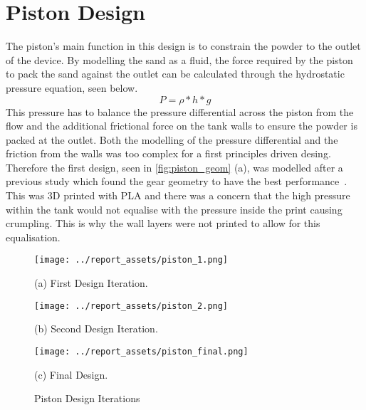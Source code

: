 \section{Piston Design}\label{sec:piston}
The piston's main function in this design is to constrain the powder to the outlet of the device. By modelling the sand as a fluid, the force required by the piston to pack the sand against the outlet can be calculated through the hydrostatic pressure equation, seen below. 
\begin{equation}\label{equ:hydrostatic}
P = \rho * h * g
\end{equation}
This pressure has to balance the pressure differential across the piston from the flow and the additional frictional force on the tank walls to ensure the powder is packed at the outlet. Both the modelling of the pressure differential and the friction from the walls was too complex for a first principles driven desing. Therefore the first design, seen in \autoref{fig:piston_geom} (a), was modelled after a previous study which found the gear geometry to have the best performance~\cite{TANG2023118406}. This was 3D printed with PLA and there was a concern that the high pressure within the tank would not equalise with the pressure inside the print causing crumpling. This is why the wall layers were not printed to allow for this equalisation. 
\begin{figure}[htbp]
    \centering

    \begin{minipage}{0.3\textwidth}
        \centering
        \texttt{[image: ../report\_assets/piston\_1.png]}
        \caption*{(a) First Design Iteration.}\label{fig:piston_geom_1}
    \end{minipage}
    \hfill
    \begin{minipage}{0.3\textwidth}
        \centering
        \texttt{[image: ../report\_assets/piston\_2.png]}
        \caption*{(b) Second Design Iteration.}\label{fig:piston_geom_2}
    \end{minipage}
    \hfill
    \begin{minipage}{0.3\textwidth}
        \centering
        \texttt{[image: ../report\_assets/piston\_final.png]}
        \caption*{(c) Final Design.}\label{fig:piston_geom_3}
    \end{minipage}
    \caption{Piston Design Iterations}\label{fig:piston_geom}
\end{figure}
